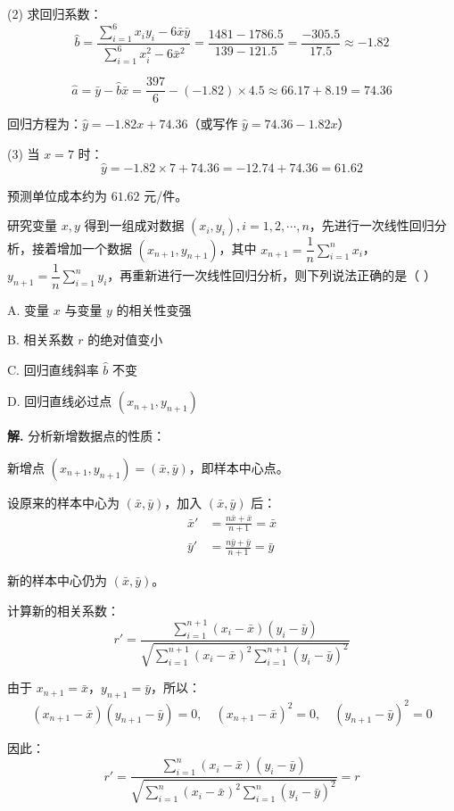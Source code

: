 \documentclass[11pt]{ctexrep}
\begin{document}
(2) 求回归系数：
\[
\hat{b} = \frac{\sum_{i=1}^{6}x_i y_i - 6\bar{x}\bar{y}}{\sum_{i=1}^{6}x_i^2 - 6\bar{x}^2} = \frac{1481 - 1786.5}{139 - 121.5} = \frac{-305.5}{17.5} \approx -1.82
\]

\[
\hat{a} = \bar{y} - \hat{b}\bar{x} = \frac{397}{6} - (-1.82) \times 4.5 \approx 66.17 + 8.19 = 74.36
\]

回归方程为：$\hat{y} = -1.82x + 74.36$（或写作 $\hat{y} = 74.36 - 1.82x$）

(3) 当 $x = 7$ 时：
\[
\hat{y} = -1.82 \times 7 + 74.36 = -12.74 + 74.36 = 61.62
\]

预测单位成本约为 $61.62$ 元/件。

\begin{realexam}[2025 上海二模]
    研究变量 $x, y$ 得到一组成对数据 $(x_i, y_i), i = 1, 2, \cdots, n$，先进行一次线性回归分析，接着增加一个数据 $(x_{n+1}, y_{n+1})$，其中 $x_{n+1} = \dfrac{1}{n}\sum_{i=1}^{n}x_i$，$y_{n+1} = \dfrac{1}{n}\sum_{i=1}^{n}y_i$，再重新进行一次线性回归分析，则下列说法正确的是（  ）

    A. 变量 $x$ 与变量 $y$ 的相关性变强

    B. 相关系数 $r$ 的绝对值变小

    C. 回归直线斜率 $\hat{b}$ 不变

    D. 回归直线必过点 $(x_{n+1}, y_{n+1})$
\end{realexam}

\textbf{解.} 分析新增数据点的性质：

新增点 $(x_{n+1}, y_{n+1}) = (\bar{x}, \bar{y})$，即样本中心点。

设原来的样本中心为 $(\bar{x}, \bar{y})$，加入 $(\bar{x}, \bar{y})$ 后：
\begin{align*}
\bar{x}' &= \frac{n\bar{x} + \bar{x}}{n+1} = \bar{x} \\
\bar{y}' &= \frac{n\bar{y} + \bar{y}}{n+1} = \bar{y}
\end{align*}

新的样本中心仍为 $(\bar{x}, \bar{y})$。

计算新的相关系数：
\[
r' = \frac{\sum_{i=1}^{n+1}(x_i - \bar{x})(y_i - \bar{y})}{\sqrt{\sum_{i=1}^{n+1}(x_i - \bar{x})^2 \sum_{i=1}^{n+1}(y_i - \bar{y})^2}}
\]

由于 $x_{n+1} = \bar{x}$，$y_{n+1} = \bar{y}$，所以：
\[
(x_{n+1} - \bar{x})(y_{n+1} - \bar{y}) = 0, \quad (x_{n+1} - \bar{x})^2 = 0, \quad (y_{n+1} - \bar{y})^2 = 0
\]

因此：
\[
r' = \frac{\sum_{i=1}^{n}(x_i - \bar{x})(y_i - \bar{y})}{\sqrt{\sum_{i=1}^{n}(x_i - \bar{x})^2 \sum_{i=1}^{n}(y_i - \bar{y})^2}} = r
\]
\end{document}
